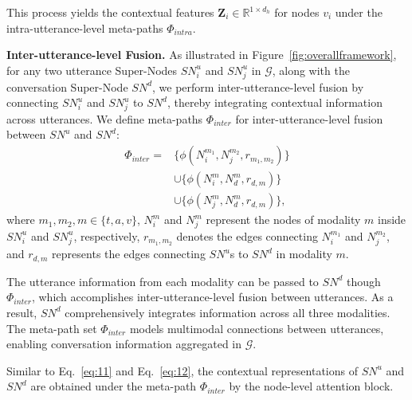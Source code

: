 \documentclass[11pt]{article}
\begin{document}
This process yields the contextual features $\bm{Z}_i \in \mathbb{R}^{1 \times d_h}$ for nodes $v_i$ under the intra-utterance-level meta-paths $\Phi_{intra}$.

\noindent\textbf{Inter-utterance-level Fusion.} As illustrated in Figure~\ref{fig:overallframework}, for any two utterance Super-Nodes $SN_i^u$ and $SN_j^u$ in $\mathcal{G}$, along with the conversation Super-Node $SN^d$, we perform inter-utterance-level fusion by connecting $SN_i^u$ and $SN_j^u$ to $SN^d$, thereby integrating contextual information across utterances.
We define meta-paths $\Phi_{inter}$ for inter-utterance-level fusion between $SN^u$ and $SN^d$:
\begin{equation}
\begin{aligned}
\Phi_{inter} = &\{\phi (N_i^{m_1}, N_j^{m_2}, r_{m_1,m_2})\} \\
&\cup \{ \phi(N_i^m, N_d^m, r_{d,m})\} \\
&\cup \{ \phi(N_j^m, N_d^m, r_{d,m})\},
\end{aligned}
\end{equation}
where $m_1, m_2, m \in \{t, a, v\}$, $N_i^m$ and $N_j^m$ represent the nodes of modality $m$ inside $SN_i^u$ and $SN_j^u$, respectively, $r_{m_1,m_2}$ denotes the edges connecting $N_i^{m_1}$ and $N_j^{m_2}$, and $r_{d,m}$ represents the edges connecting $SN^u$s to $SN^d$ in modality $m$.

The utterance information from each modality can be passed to $SN^d$ though $\Phi_{inter}$, which accomplishes inter-utterance-level fusion between utterances.
As a result, $SN^d$ comprehensively integrates information across all three modalities.
The meta-path set $\Phi_{inter}$ models multimodal connections between utterances, enabling conversation information aggregated in $\mathcal{G}$.

Similar to Eq.~\ref{eq:11} and Eq.~\ref{eq:12}, the contextual representations of $SN^u$ and $SN^d$ are obtained under the meta-path $\Phi_{inter}$ by the node-level attention block.
\end{document}
